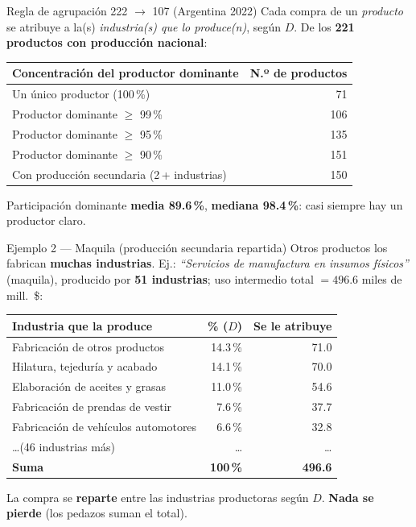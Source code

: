 \documentclass[aspectratio=169,10pt]{beamer}
\begin{document}
\begin{frame}{Regla de agrupación 222 $\to$ 107 (Argentina 2022)}
  Cada compra de un \emph{producto} se atribuye a la(s) \emph{industria(s) que lo produce(n)}, según $D$.
  De los \textbf{221 productos con producción nacional}:
  \begin{center}
  \begin{tabular}{lr}
    \toprule
    Concentración del productor dominante & N.º de productos \\
    \midrule
    Un único productor (100\,\%) & 71 \\
    Productor dominante $\ge$ 99\,\% & 106 \\
    Productor dominante $\ge$ 95\,\% & 135 \\
    Productor dominante $\ge$ 90\,\% & 151 \\
    \midrule
    Con producción secundaria (2\,+ industrias) & 150 \\
    \bottomrule
  \end{tabular}
  \end{center}
  \begin{center}\small
  Participación dominante \textbf{media 89.6\,\%}, \textbf{mediana 98.4\,\%}: casi siempre hay un productor claro.
  \end{center}
\end{frame}

\begin{frame}{Ejemplo 2 — Maquila (producción secundaria repartida)}
  Otros productos los fabrican \textbf{muchas industrias}. Ej.: \emph{``Servicios de manufactura en insumos físicos''} (maquila),
  producido por \textbf{51 industrias}; uso intermedio total $= 496.6$ miles de mill.\ \$:
  \begin{center}
  \begin{tabular}{lrr}
    \toprule
    Industria que la produce & \% ($D$) & Se le atribuye \\
    \midrule
    Fabricación de otros productos & 14.3\,\% & 71.0 \\
    Hilatura, tejeduría y acabado  & 14.1\,\% & 70.0 \\
    Elaboración de aceites y grasas& 11.0\,\% & 54.6 \\
    Fabricación de prendas de vestir& \phantom{0}7.6\,\% & 37.7 \\
    Fabricación de vehículos automotores & \phantom{0}6.6\,\% & 32.8 \\
    \ldots (46 industrias más) & \ldots & \ldots \\
    \midrule
    \textbf{Suma} & \textbf{100\,\%} & \textbf{496.6} \\
    \bottomrule
  \end{tabular}
  \end{center}
  La compra se \textbf{reparte} entre las industrias productoras según $D$. \textbf{Nada se pierde} (los pedazos suman el total).
\end{frame}
\end{document}

